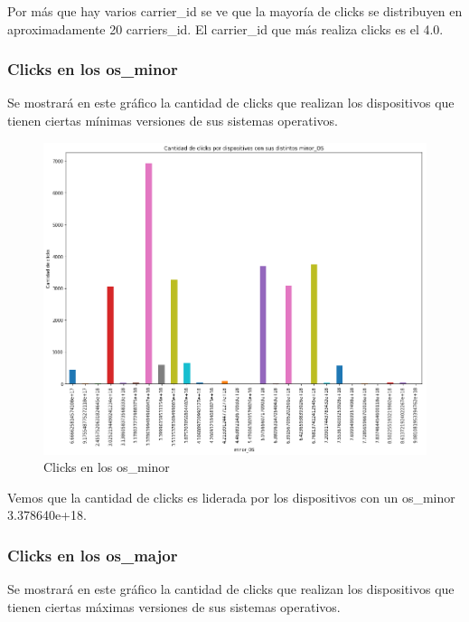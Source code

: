 \documentclass[a4paper, 12pt]{article}
\begin{document}
		 Por más que hay varios carrier\_id se ve que la mayoría de clicks se distribuyen en aproximadamente 20 carriers\_id. El carrier\_id que más realiza clicks es el 4.0.

	\subsubsection{Clicks en los os\_minor}
		 Se mostrará en este gráfico la cantidad de clicks que realizan los dispositivos que tienen ciertas mínimas versiones de sus sistemas operativos.

		\FloatBarrier
		\begin{figure}[h]
			\centering
			\includegraphics[scale = 0.37]{images/clicks/clicks_minor_OS.png}
			\caption{Clicks en los os\_minor}
		\end{figure}
		\FloatBarrier

		 Vemos que la cantidad de clicks es liderada por los dispositivos con un os\_minor 3.378640e+18.

	\subsubsection{Clicks en los os\_major}
		 Se mostrará en este gráfico la cantidad de clicks que realizan los dispositivos que tienen ciertas máximas
		versiones de sus sistemas operativos.
\end{document}
